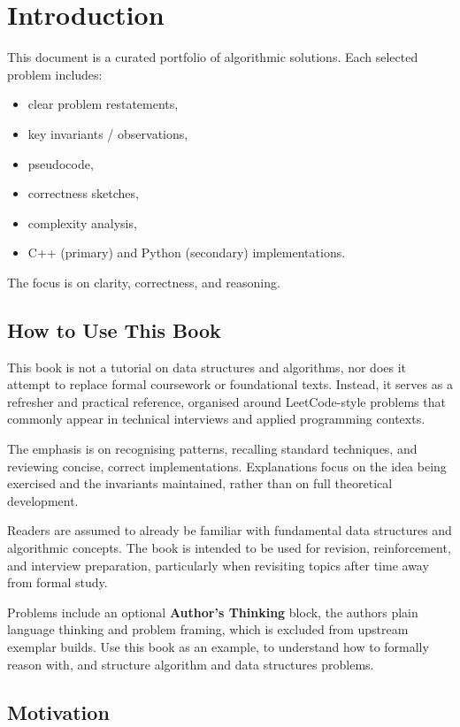\section{Introduction}

This document is a curated portfolio of algorithmic solutions.
Each selected problem includes:

\begin{itemize}[nosep]
  \item clear problem restatements,
  \item key invariants / observations,
  \item pseudocode,
  \item correctness sketches,
  \item complexity analysis,
  \item C++ (primary) and Python (secondary) implementations.
\end{itemize}

The focus is on clarity, correctness, and reasoning.


\subsection{How to Use This Book}
This book is not a tutorial on data structures and algorithms, nor does it attempt 
to replace formal coursework or foundational texts. Instead, it serves as a 
refresher and practical reference, organised around LeetCode-style problems that
commonly appear in technical interviews and applied programming contexts.

The emphasis is on recognising patterns, recalling standard techniques, and 
reviewing concise, correct implementations. Explanations focus on the idea being
exercised and the invariants maintained, rather than on full theoretical development.

Readers are assumed to already be familiar with fundamental data structures and 
algorithmic concepts. The book is intended to be used for revision, reinforcement, 
and interview preparation, particularly when revisiting topics after time away from 
formal study.

Problems include an optional \textbf{Author's Thinking} block, the authors plain 
language thinking and problem framing, which is excluded from upstream exemplar builds.
Use this book as an example, to understand how to formally reason with, and 
structure algorithm and data structures problems.


\subsection{Motivation}

